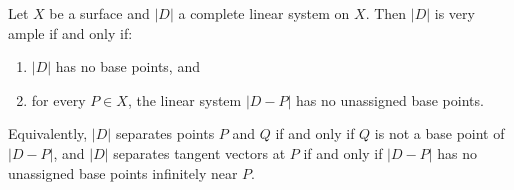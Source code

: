Let $X$ be a surface and $|D|$ a complete linear system on $X$. Then $|D|$ is very ample if and only if:
\begin{enumerate}
\item[(a)] $|D|$ has no base points, and
\item[(b)] for every $P \in X$, the linear system $|D - P|$ has no unassigned base points.
\end{enumerate}
Equivalently, $|D|$ separates points $P$ and $Q$ if and only if $Q$ is not a base point of $|D - P|$, and $|D|$ separates tangent vectors at $P$ if and only if $|D - P|$ has no unassigned base points infinitely near $P$.
